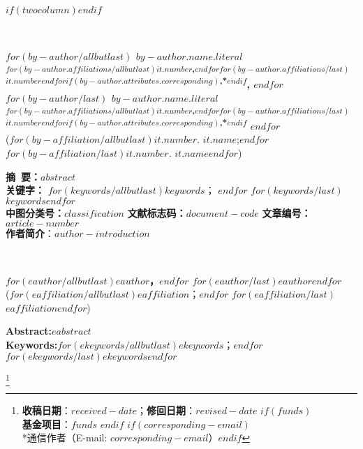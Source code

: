 $if(twocolumn)$\twocolumn$endif$
\begin{figure*}[t]
\begin{center}
 \parbox{\textwidth}{
   \begin{center}
      \\
     \vspace{10pt}
   \end{center}
   \begin{center}
    \textbf{
      $for(by-author/allbutlast)$
        $by-author.name.literal$
        \textsuperscript{$for(by-author.affiliations/allbutlast)$$it.number$,$endfor$$for(by-author.affiliations/last)$$it.number$$endfor$$if(by-author.attributes.corresponding)$,*$endif$},
      $endfor$
      $for(by-author/last)$
        $by-author.name.literal$
        \textsuperscript{$for(by-author.affiliations/allbutlast)$$it.number$,$endfor$$for(by-author.affiliations/last)$$it.number$$endfor$$if(by-author.attributes.corresponding)$,*$endif$}
      $endfor$
    }\\[2pt]
    \small{
      ($for(by-affiliation/allbutlast)$$it.number$. $it.name$;$endfor$
      $for(by-affiliation/last)$$it.number$. $it.name$$endfor$)}\\[7pt]
    \end{center}
   {
    \small{
      \textbf{摘~要：}$abstract$ \\
      \textbf{关键字：} $for(keywords/allbutlast)$$keywords$； $endfor$ $for(keywords/last)$$keywords$$endfor$ \\
      \textbf{中图分类号：}$classification$ \hfill
      \textbf{文献标志码：}$document-code$ \hfill
      \textbf{文章编号：}$article-number$ \\
      \textbf{作者简介}：$author-introduction$
    }
  }
}
\end{center}

\begin{center}
 \parbox{\textwidth}{
   \begin{center}
      \vspace{20pt}
       \\
      \vspace{10pt}
   \end{center}
   \begin{center}
    \textbf{
      $for(eauthor/allbutlast)$$eauthor$，$endfor$
      $for(eauthor/last)$$eauthor$$endfor$
    }\\[2pt]
    \small{
      ($for(eaffiliation/allbutlast)$$eaffiliation$；$endfor$
      $for(eaffiliation/last)$$eaffiliation$$endfor$)}\\[7pt]
    \end{center}
   {
    \small{
      \textbf{Abstract:}\quad $eabstract$ \\
      \textbf{Keywords:}\quad $for(ekeywords/allbutlast)$$ekeywords$；$endfor$ $for(ekeywords/last)$$ekeywords$$endfor$
    }
   }
 }
\end{center}
\end{figure*}

\footnote{ 
  \textbf{收稿日期}：$received-date$；\textbf{修回日期}：$revised-date$
  $if(funds)$ \\\textbf{基金项目}：$funds$ $endif$
  $if(corresponding-email)$ \\ *通信作者（E-mail: $corresponding-email$）$endif$
}

\pagestyle{fancy}
\setcounter{section}{-1}
